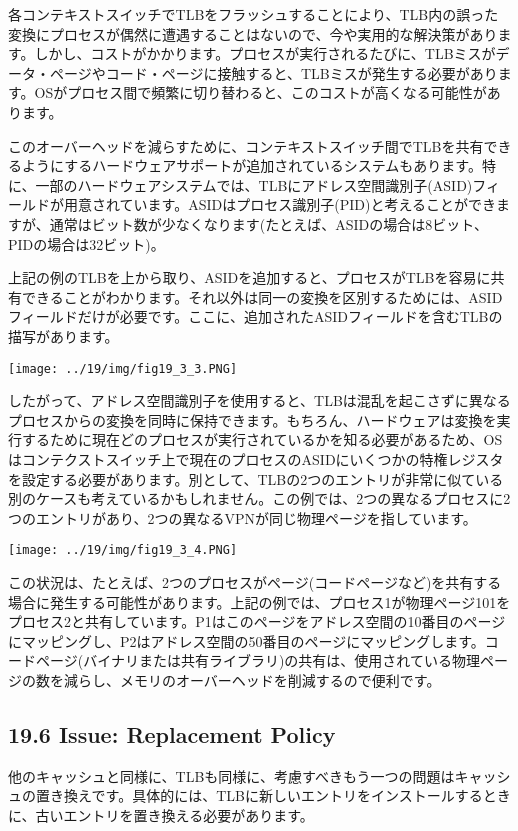 各コンテキストスイッチでTLBをフラッシュすることにより、TLB内の誤った変換にプロセスが偶然に遭遇することはないので、今や実用的な解決策があります。しかし、コストがかかります。プロセスが実行されるたびに、TLBミスがデータ・ページやコード・ページに接触すると、TLBミスが発生する必要があります。OSがプロセス間で頻繁に切り替わると、このコストが高くなる可能性があります。

このオーバーヘッドを減らすために、コンテキストスイッチ間でTLBを共有できるようにするハードウェアサポートが追加されているシステムもあります。特に、一部のハードウェアシステムでは、TLBにアドレス空間識別子(ASID)フィールドが用意されています。ASIDはプロセス識別子(PID)と考えることができますが、通常はビット数が少なくなります(たとえば、ASIDの場合は8ビット、PIDの場合は32ビット)。

上記の例のTLBを上から取り、ASIDを追加すると、プロセスがTLBを容易に共有できることがわかります。それ以外は同一の変換を区別するためには、ASIDフィールドだけが必要です。ここに、追加されたASIDフィールドを含むTLBの描写があります。

\texttt{[image: ../19/img/fig19\_3\_3.PNG]}

したがって、アドレス空間識別子を使用すると、TLBは混乱を起こさずに異なるプロセスからの変換を同時に保持できます。もちろん、ハードウェアは変換を実行するために現在どのプロセスが実行されているかを知る必要があるため、OSはコンテクストスイッチ上で現在のプロセスのASIDにいくつかの特権レジスタを設定する必要があります。別として、TLBの2つのエントリが非常に似ている別のケースも考えているかもしれません。この例では、2つの異なるプロセスに2つのエントリがあり、2つの異なるVPNが同じ物理ページを指しています。

\texttt{[image: ../19/img/fig19\_3\_4.PNG]}

この状況は、たとえば、2つのプロセスがページ(コードページなど)を共有する場合に発生する可能性があります。上記の例では、プロセス1が物理ページ101をプロセス2と共有しています。P1はこのページをアドレス空間の10番目のページにマッピングし、P2はアドレス空間の50番目のページにマッピングします。コードページ(バイナリまたは共有ライブラリ)の共有は、使用されている物理ページの数を減らし、メモリのオーバーヘッドを削減するので便利です。

\hypertarget{issue-replacement-policy}{%
\subsection*{19.6 Issue: Replacement
Policy}\label{issue-replacement-policy}}

他のキャッシュと同様に、TLBも同様に、考慮すべきもう一つの問題はキャッシュの置き換えです。具体的には、TLBに新しいエントリをインストールするときに、古いエントリを置き換える必要があります。

